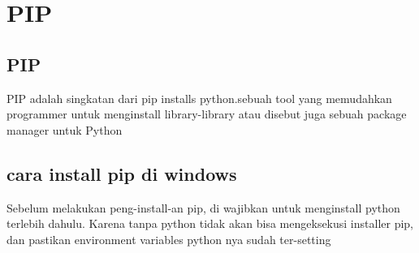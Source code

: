 
\section{PIP}

    \subsection{PIP}
	PIP adalah singkatan dari pip installs python.sebuah tool yang memudahkan programmer untuk menginstall library-library  atau disebut juga sebuah package manager untuk Python

	\subsection{cara install pip di windows}
	Sebelum melakukan peng-install-an pip, di wajibkan untuk menginstall python terlebih dahulu. Karena tanpa python tidak akan bisa mengeksekusi installer pip, dan pastikan environment variables python nya sudah ter-setting
